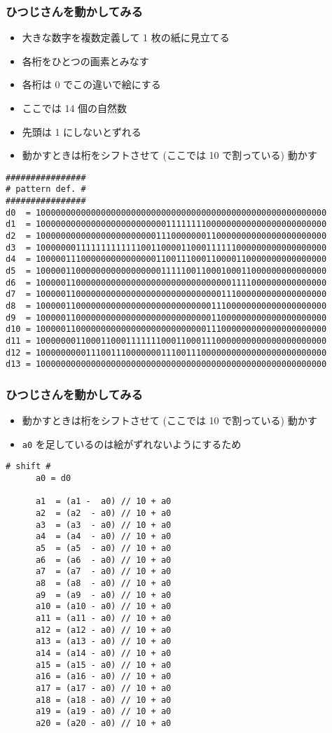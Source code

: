 \begin{frame}
\frametitle{ひつじさんを動かしてみる}
  \begin{itemize}
\scriptsize
\item 大きな数字を複数定義して 1 枚の紙に見立てる
\item 各桁をひとつの画素とみなす
\item 各桁は 0 でこの違いで絵にする
\item ここでは 14 個の自然数
\item 先頭は 1 にしないとずれる
\item 動かすときは桁をシフトさせて (ここでは 10 で割っている) 動かす
  \end{itemize}
  \begin{lstlisting}[caption={sheep.py (declaration)},label=sheep-data]
################
# pattern def. #
################
d0  = 1000000000000000000000000000000000000000000000000000000000
d1  = 1000000000000000000000000011111111000000000000000000000000
d2  = 1000000000000000000000001110000000110000000000000000000000
d3  = 1000000011111111111110011000011000111111000000000000000000
d4  = 1000001110000000000000001100111000110000110000000000000000
d5  = 1000001100000000000000000111110011000100011000000000000000
d6  = 1000001100000000000000000000000000000001111000000000000000
d7  = 1000001100000000000000000000000000000111000000000000000000
d8  = 1000001100000000000000000000000000011100000000000000000000
d9  = 1000001100000000000000000000000000011000000000000000000000
d10 = 1000001100000000000000000000000000111000000000000000000000
d11 = 1000000011000110001111111000110001110000000000000000000000
d12 = 1000000000111001110000000111001110000000000000000000000000
d13 = 1000000000000000000000000000000000000000000000000000000000
  \end{lstlisting}
\end{frame}
\begin{frame}
\frametitle{ひつじさんを動かしてみる}
  \begin{itemize}
\scriptsize
\item 動かすときは桁をシフトさせて (ここでは 10 で割っている) 動かす
\item {\tt a0} を足しているのは絵がずれないようにするため
  \end{itemize}
  \begin{lstlisting}[caption={sheep.py (shift)},label=sheep-shift,firstnumber=last]
      # shift #
      a0 = d0

      a1  = (a1 -  a0) // 10 + a0
      a2  = (a2  - a0) // 10 + a0
      a3  = (a3  - a0) // 10 + a0
      a4  = (a4  - a0) // 10 + a0
      a5  = (a5  - a0) // 10 + a0
      a6  = (a6  - a0) // 10 + a0
      a7  = (a7  - a0) // 10 + a0
      a8  = (a8  - a0) // 10 + a0
      a9  = (a9  - a0) // 10 + a0
      a10 = (a10 - a0) // 10 + a0
      a11 = (a11 - a0) // 10 + a0
      a12 = (a12 - a0) // 10 + a0
      a13 = (a13 - a0) // 10 + a0
      a14 = (a14 - a0) // 10 + a0
      a15 = (a15 - a0) // 10 + a0
      a16 = (a16 - a0) // 10 + a0
      a17 = (a17 - a0) // 10 + a0
      a18 = (a18 - a0) // 10 + a0
      a19 = (a19 - a0) // 10 + a0
      a20 = (a20 - a0) // 10 + a0
  \end{lstlisting}
\end{frame}

